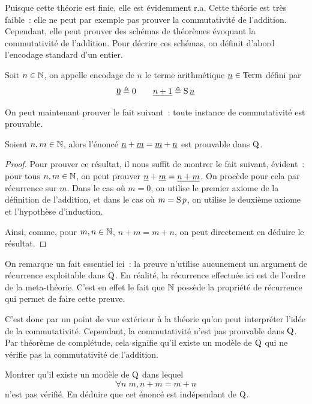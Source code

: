 Puisque cette théorie est finie, elle est évidemment r.a. Cette théorie est
très faible~: elle ne peut par exemple pas prouver la commutativité de
l'addition. Cependant, elle peut prouver des schémas de théorèmes évoquant
la commutativité de l'addition. Pour décrire ces schémas, on définit d'abord
l'encodage standard d'un entier.

\begin{definition}
  Soit $n \in \mathbb N$, on appelle encodage de $n$ le terme arithmétique
  $\underline{n} \in \operatorname{Term}$ défini par
  \[\underline{0} \triangleq 0 \qquad \underline{n+1} \triangleq \operatorname{S}\underline{n}\]
\end{definition}

On peut maintenant prouver le fait suivant~: toute instance de commutativité
est prouvable.

\begin{proposition}
  Soient $n,m \in \mathbb N$, alors l'énoncé
  $\underline{n} + \underline{m} = \underline{m} + \underline{n}$ est prouvable dans
  $\operatorname{Q}$.
\end{proposition}

\begin{proof}
  Pour prouver ce résultat, il nous suffit de montrer le fait suivant, évident~:
  pour tous $n,m \in \mathbb N$, on peut prouver
  $\underline{n} + \underline{m} = \underline{n+m}$. On procède pour cela par récurrence
  sur $m$. Dans le cas où $m = 0$, on utilise le premier axiome de la définition
  de l'addition, et dans le cas où $m = \operatorname{S} p$, on utilise le deuxième axiome
  et l'hypothèse d'induction.

  Ainsi, comme, pour $m,n\in\mathbb N$, $n + m = m + n$, on peut directement en
  déduire le résultat.
\end{proof}

On remarque un fait essentiel ici~: la preuve n'utilise aucunement un argument
de récurrence exploitable dans $\operatorname{Q}$. En réalité, la récurrence
effectuée ici est de l'ordre de la meta-théorie. C'est en effet le fait que
$\mathbb N$ possède la propriété de récurrence qui permet de faire cette preuve.

C'est donc par un point de vue extérieur à la théorie qu'on peut interpréter
l'idée de la commutativité. Cependant, la commutativité n'est pas prouvable dans
$\operatorname{Q}$. Par théorème de complétude, cela signifie qu'il existe un modèle
de $\operatorname{Q}$ qui ne vérifie pas la commutativité de l'addition.

\begin{exercise}
  Montrer qu'il existe un modèle de $\operatorname{Q}$ dans lequel
  \[\forall n\;m, n + m = m + n\]
  n'est pas vérifié. En déduire que cet énoncé est indépendant de $\operatorname{Q}$.
\end{exercise}

